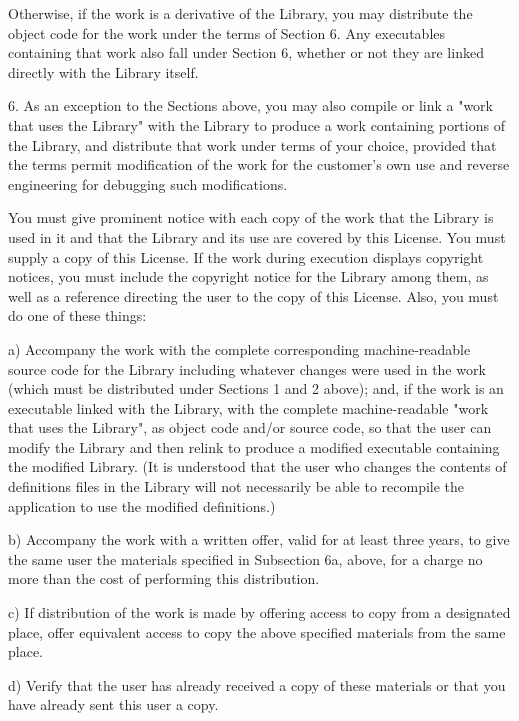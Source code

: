 \documentclass[twoside]{tceusermanual}
\begin{document}
Otherwise, if the work is a derivative of the Library, you may
distribute the object code for the work under the terms of
Section 6. Any executables containing that work also fall under
Section 6, whether or not they are linked directly with the
Library itself.
 
6. As an exception to the Sections above, you may also compile
or link a "work that uses the Library" with the Library to
produce a work containing portions of the Library, and
distribute that work under terms of your choice, provided that
the terms permit modification of the work for the customer's own
use and reverse engineering for debugging such modifications.

You must give prominent notice with each copy of the work that
the Library is used in it and that the Library and its use are
covered by this License.  You must supply a copy of this
License.  If the work during execution displays copyright
notices, you must include the copyright notice for the Library
among them, as well as a reference directing the user to the
copy of this License.  Also, you must do one of these things:

    a) Accompany the work with the complete corresponding
    machine-readable source code for the Library including whatever
    changes were used in the work (which must be distributed under
    Sections 1 and 2 above); and, if the work is an executable linked
    with the Library, with the complete machine-readable "work that
    uses the Library", as object code and/or source code, so that the
    user can modify the Library and then relink to produce a modified
    executable containing the modified Library.  (It is understood
    that the user who changes the contents of definitions files in the
    Library will not necessarily be able to recompile the application
    to use the modified definitions.)

    b) Accompany the work with a written offer, valid for at
    least three years, to give the same user the materials
    specified in Subsection 6a, above, for a charge no more
    than the cost of performing this distribution.

    c) If distribution of the work is made by offering access to copy
    from a designated place, offer equivalent access to copy the above
    specified materials from the same place.

    d) Verify that the user has already received a copy of these
    materials or that you have already sent this user a copy.
\end{document}
